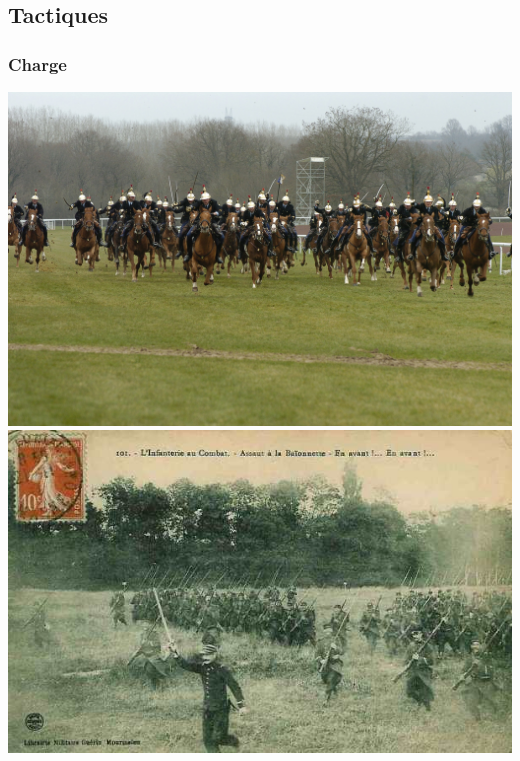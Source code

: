 \documentclass{article}
\begin{document}
\subsection{Tactiques}

\subsubsection{Charge}
\includegraphics[width=\linewidth]{../ressources/Charge-de-cavalerie}
\includegraphics[width=\linewidth]{../ressources/charge_infanterie}
\cite{charge_tactic, charge_cavalery}
\end{document}
